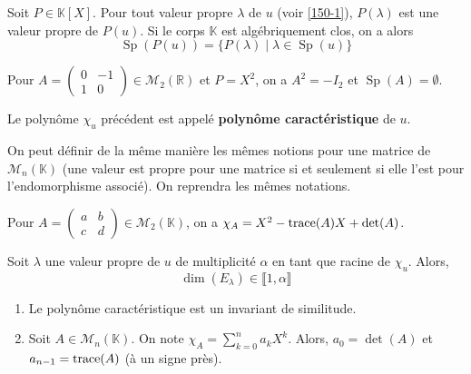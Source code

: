 
  \begin{theorem}
    Soit $P \in \mathbb{K}[X]$. Pour tout valeur propre $\lambda$ de $u$ (voir \cref{150-1}), $P(\lambda)$ est une valeur propre de $P(u)$. Si le corps $\mathbb{K}$ est algébriquement clos, on a alors
    \[ \operatorname{Sp}(P(u)) = \{ P(\lambda) \mid \lambda \in \operatorname{Sp}(u) \} \]
  \end{theorem}

  \begin{cexample}
    Pour $A = \begin{pmatrix} 0 & -1 \\ 1 & 0 \end{pmatrix} \in \mathcal{M}_2(\mathbb{R})$ et $P = X^2$, on a $A^2 = -I_2$ et $\operatorname{Sp}(A) = \emptyset$.
  \end{cexample}


  \begin{definition}
    Le polynôme $\chi_u$ précédent est appelé \textbf{polynôme caractéristique} de $u$.
  \end{definition}

  \begin{remark}
    On peut définir de la même manière les mêmes notions pour une matrice de $\mathcal{M}_n(\mathbb{K})$ (une valeur est propre pour une matrice si et seulement si elle l'est pour l'endomorphisme associé). On reprendra les mêmes notations.
  \end{remark}

  \begin{example}
    Pour $A = \begin{pmatrix} a & b \\ c & d \end{pmatrix} \in \mathcal{M}_2(\mathbb{K})$, on a $\chi_A = X^2 - \operatorname{trace}(A)X + \det(A)$.
  \end{example}

  \begin{proposition}
    Soit $\lambda$ une valeur propre de $u$ de multiplicité $\alpha$ en tant que racine de $\chi_u$. Alors,
    \[ \dim(E_\lambda) \in \llbracket 1, \alpha \rrbracket \]
  \end{proposition}


  \begin{proposition}
    \begin{enumerate}[label=(\roman*)]
      \item Le polynôme caractéristique est un invariant de similitude.
      \item Soit $A \in \mathcal{M}_n(\mathbb{K})$. On note $\chi_A = \sum_{k=0}^n a_k X^k$. Alors, $a_0 = \det(A)$ et $a_{n-1} = \operatorname{trace}(A)$ (à un signe près).
    \end{enumerate}
  \end{proposition}

